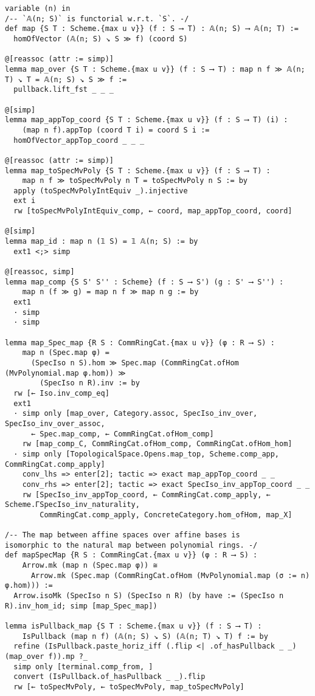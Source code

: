 \documentclass{article}
\begin{document}
\begin{lstlisting}[language=Lean, caption={AffineSpace.lean}]
variable (n) in
/-- `𝔸(n; S)` is functorial w.r.t. `S`. -/
def map {S T : Scheme.{max u v}} (f : S ⟶ T) : 𝔸(n; S) ⟶ 𝔸(n; T) :=
  homOfVector (𝔸(n; S) ↘ S ≫ f) (coord S)

@[reassoc (attr := simp)]
lemma map_over {S T : Scheme.{max u v}} (f : S ⟶ T) : map n f ≫ 𝔸(n; T) ↘ T = 𝔸(n; S) ↘ S ≫ f :=
  pullback.lift_fst _ _ _

@[simp]
lemma map_appTop_coord {S T : Scheme.{max u v}} (f : S ⟶ T) (i) :
    (map n f).appTop (coord T i) = coord S i :=
  homOfVector_appTop_coord _ _ _

@[reassoc (attr := simp)]
lemma map_toSpecMvPoly {S T : Scheme.{max u v}} (f : S ⟶ T) :
    map n f ≫ toSpecMvPoly n T = toSpecMvPoly n S := by
  apply (toSpecMvPolyIntEquiv _).injective
  ext i
  rw [toSpecMvPolyIntEquiv_comp, ← coord, map_appTop_coord, coord]

@[simp]
lemma map_id : map n (𝟙 S) = 𝟙 𝔸(n; S) := by
  ext1 <;> simp

@[reassoc, simp]
lemma map_comp {S S' S'' : Scheme} (f : S ⟶ S') (g : S' ⟶ S'') :
    map n (f ≫ g) = map n f ≫ map n g := by
  ext1
  · simp
  · simp

lemma map_Spec_map {R S : CommRingCat.{max u v}} (φ : R ⟶ S) :
    map n (Spec.map φ) =
      (SpecIso n S).hom ≫ Spec.map (CommRingCat.ofHom (MvPolynomial.map φ.hom)) ≫
        (SpecIso n R).inv := by
  rw [← Iso.inv_comp_eq]
  ext1
  · simp only [map_over, Category.assoc, SpecIso_inv_over, SpecIso_inv_over_assoc,
      ← Spec.map_comp, ← CommRingCat.ofHom_comp]
    rw [map_comp_C, CommRingCat.ofHom_comp, CommRingCat.ofHom_hom]
  · simp only [TopologicalSpace.Opens.map_top, Scheme.comp_app, CommRingCat.comp_apply]
    conv_lhs => enter[2]; tactic => exact map_appTop_coord _ _
    conv_rhs => enter[2]; tactic => exact SpecIso_inv_appTop_coord _ _
    rw [SpecIso_inv_appTop_coord, ← CommRingCat.comp_apply, ← Scheme.ΓSpecIso_inv_naturality,
        CommRingCat.comp_apply, ConcreteCategory.hom_ofHom, map_X]

/-- The map between affine spaces over affine bases is
isomorphic to the natural map between polynomial rings. -/
def mapSpecMap {R S : CommRingCat.{max u v}} (φ : R ⟶ S) :
    Arrow.mk (map n (Spec.map φ)) ≅
      Arrow.mk (Spec.map (CommRingCat.ofHom (MvPolynomial.map (σ := n) φ.hom))) :=
  Arrow.isoMk (SpecIso n S) (SpecIso n R) (by have := (SpecIso n R).inv_hom_id; simp [map_Spec_map])

lemma isPullback_map {S T : Scheme.{max u v}} (f : S ⟶ T) :
    IsPullback (map n f) (𝔸(n; S) ↘ S) (𝔸(n; T) ↘ T) f := by
  refine (IsPullback.paste_horiz_iff (.flip <| .of_hasPullback _ _) (map_over f)).mp ?_
  simp only [terminal.comp_from, ]
  convert (IsPullback.of_hasPullback _ _).flip
  rw [← toSpecMvPoly, ← toSpecMvPoly, map_toSpecMvPoly]


\end{lstlisting}
\end{document}
